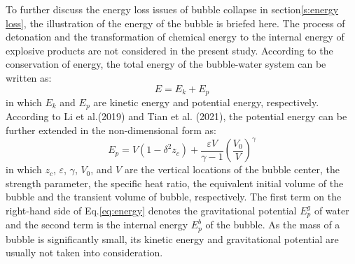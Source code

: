 \documentclass[%
 aip,
 amsmath,amssymb,
 reprint,%
]{revtex4-1}
\begin{document}
{{
To further discuss the energy loss issues of bubble collapse in section\ref{s:energy loss}, the illustration of the energy of the bubble is briefed here. The process of detonation and the transformation of chemical energy to the internal energy of explosive products are not considered in the present study. According to the conservation of energy, the total energy of the bubble-water system can be written as: 
\begin{equation}
E=E_k+E_p
\end{equation}
in which $E_k$ and $E_p$ are kinetic energy and potential energy, respectively. According to Li et al.\cite{RN2618}(2019) and Tian et al.\cite{RN2974} (2021), the potential energy can be further extended in the non-dimensional form as:
\begin{equation}
\label{eq:energy}
E_p=V(1-\delta^2 z_c)+\frac{\varepsilon V}{\gamma-1}\left(\frac{V_0}{V}\right)^{\gamma}
\end{equation}
in which $z_c$, $\varepsilon$, $\gamma$, $V_0$, and $V$ are the vertical locations of the bubble center, the strength parameter, the specific heat ratio, the equivalent initial volume of the bubble and the transient volume of bubble, respectively. The first term on the right-hand side of Eq.\eqref{eq:energy} denotes the gravitational potential $E_p^g$ of water and the second term is the internal energy  $E_p^b$ of the bubble. As the mass of a bubble is significantly small, its kinetic energy and gravitational potential are usually not taken into consideration. 

}}
\end{document}
